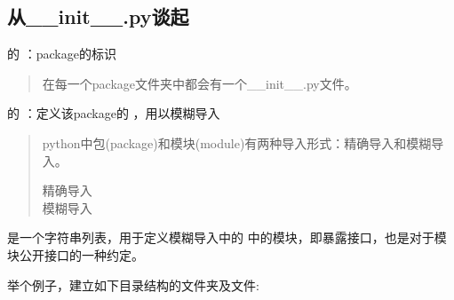 \documentclass[letterpaper,10pt,english]{sphinxmanual}
\begin{document}
\subsection{从\_\_init\_\_.py谈起}
\label{\detokenize{python/02_all:init-py}}
 的  ：package的标识
\begin{quote}

在每一个package文件夹中都会有一个\_\_init\_\_.py文件。
\end{quote}

 的  ：定义该package的  ，用以模糊导入
\begin{quote}

python中包(package)和模块(module)有两种导入形式：精确导入和模糊导入。
\begin{description}
\item[{精确导入}] \leavevmode
{}%
\begin{sphinxVerbatim}[commandchars=\\\{\}]
    
 
\end{sphinxVerbatim}

\item[{模糊导入}] \leavevmode
{}%
\begin{sphinxVerbatim}[commandchars=\\\{\}]
   
\end{sphinxVerbatim}

\end{description}
\end{quote}

 是一个字符串列表，用于定义模糊导入中的 \sphinxcode{\sphinxupquote{*}} 中的模块，即暴露接口，也是对于模块公开接口的一种约定。

举个例子，建立如下目录结构的文件夹及文件:

%
\begin{sphinxVerbatim}[commandchars=\\\{\}]
 
 
     
     
\end{sphinxVerbatim}
\end{document}
